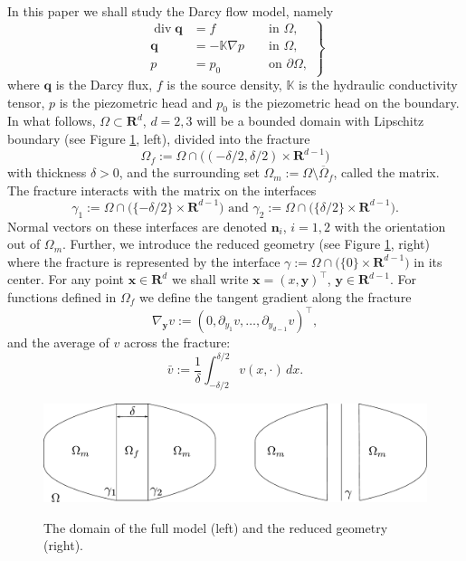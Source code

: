 \documentclass{llncs}
\def\vc#1{\mathbf{\boldsymbol{#1}}}     %
\def\tn#1{{\mathbb{#1}}}    %
\def\div{\operatorname{div}}
\def\grad{\nabla}
\def\Real{{\mathbf R}}
\def\yy{{\vc y}}
\begin{document}
In this paper we shall study the Darcy flow model, namely
\begin{equation}
\label{eq:darcy_flow}
\left.
\begin{aligned}
    \div \vc q &= f &&\mbox{ in }\Omega, \\
    \vc q &= -\tn K \grad p &&\mbox{ in }\Omega,\\
    p &= p_0 &&\mbox{ on }\partial\Omega,
\end{aligned}
\right\}
\end{equation}
where $\vc q$ is the Darcy flux, $f$ is the source density, $\tn K$ is the hydraulic conductivity tensor, $p$ is the piezometric head and $p_0$ is 
the piezometric head on the boundary.
In what follows, $\Omega \subset \Real^d$, $d=2,3$ will be a bounded domain with Lipschitz boundary (see Figure \ref{fig:omegas}, left), divided into the fracture
\[ \Omega_f:=\Omega\cap \big((-\delta/2,\delta/2)\times\Real^{d-1}\big) \]
with thickness $\delta>0$, and the surrounding set $\Omega_m:=\Omega\setminus\overline\Omega_f$, called the matrix.
The fracture interacts with the matrix on the interfaces 
\[ \gamma_1:=\Omega\cap\big( \{-\delta/2\}\times \Real^{d-1}\big) \mbox{ and }\gamma_2:=\Omega\cap\big( \{ \delta/2\}\times \Real^{d-1}\big). \]
Normal vectors on these interfaces are denoted $\vc n_i$, $i=1,2$ with the orientation out of $\Omega_m$.
Further, we introduce the reduced geometry (see Figure \ref{fig:omegas}, right)
where the fracture is represented by the interface $\gamma:=\Omega\cap\big(\{0\}\times\Real^{d-1}\big)$ in its center.
For any point $\vc x\in\Real^d$ we shall write $\vc x=(x,\yy)^\top$, $\yy\in\Real^{d-1}$.
For functions defined in $\Omega_f$ we define the tangent gradient along the fracture
\[ \nabla_\yy v:=(0,\partial_{y_1} v,\ldots,\partial_{y_{d-1}} v)^\top, \]
and the average of $v$ across the fracture:
\[ \bar v:=\frac1\delta\int_{-\delta/2}^{\delta/2} v(x,\cdot)\,dx. \]
\begin{figure}[h]
\centering
\includegraphics[width=12cm]{figures/full_model_domain}
\label{fig:omegas}
\caption{The domain of the full model (left) and the reduced geometry (right).}
\end{figure}
\end{document}
